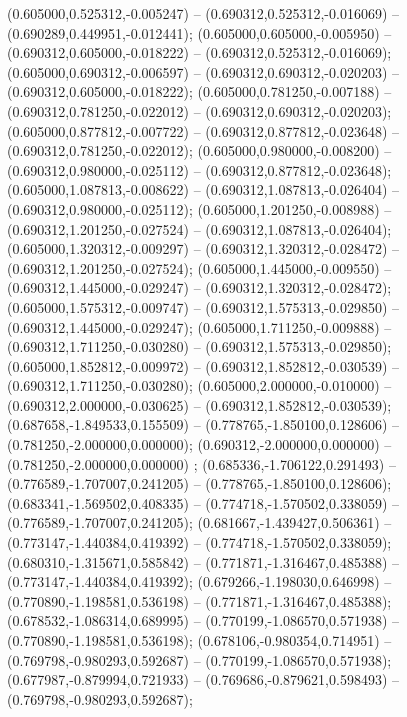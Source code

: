  (0.605000,0.525312,-0.005247) -- (0.690312,0.525312,-0.016069) -- (0.690289,0.449951,-0.012441);
 (0.605000,0.605000,-0.005950) -- (0.690312,0.605000,-0.018222) -- (0.690312,0.525312,-0.016069);
 (0.605000,0.690312,-0.006597) -- (0.690312,0.690312,-0.020203) -- (0.690312,0.605000,-0.018222);
 (0.605000,0.781250,-0.007188) -- (0.690312,0.781250,-0.022012) -- (0.690312,0.690312,-0.020203);
 (0.605000,0.877812,-0.007722) -- (0.690312,0.877812,-0.023648) -- (0.690312,0.781250,-0.022012);
 (0.605000,0.980000,-0.008200) -- (0.690312,0.980000,-0.025112) -- (0.690312,0.877812,-0.023648);
 (0.605000,1.087813,-0.008622) -- (0.690312,1.087813,-0.026404) -- (0.690312,0.980000,-0.025112);
 (0.605000,1.201250,-0.008988) -- (0.690312,1.201250,-0.027524) -- (0.690312,1.087813,-0.026404);
 (0.605000,1.320312,-0.009297) -- (0.690312,1.320312,-0.028472) -- (0.690312,1.201250,-0.027524);
 (0.605000,1.445000,-0.009550) -- (0.690312,1.445000,-0.029247) -- (0.690312,1.320312,-0.028472);
 (0.605000,1.575312,-0.009747) -- (0.690312,1.575313,-0.029850) -- (0.690312,1.445000,-0.029247);
 (0.605000,1.711250,-0.009888) -- (0.690312,1.711250,-0.030280) -- (0.690312,1.575313,-0.029850);
 (0.605000,1.852812,-0.009972) -- (0.690312,1.852812,-0.030539) -- (0.690312,1.711250,-0.030280);
 (0.605000,2.000000,-0.010000) -- (0.690312,2.000000,-0.030625) -- (0.690312,1.852812,-0.030539);
 (0.687658,-1.849533,0.155509) -- (0.778765,-1.850100,0.128606) -- (0.781250,-2.000000,0.000000);
 (0.690312,-2.000000,0.000000) -- (0.781250,-2.000000,0.000000) ;
 (0.685336,-1.706122,0.291493) -- (0.776589,-1.707007,0.241205) -- (0.778765,-1.850100,0.128606);
 (0.683341,-1.569502,0.408335) -- (0.774718,-1.570502,0.338059) -- (0.776589,-1.707007,0.241205);
 (0.681667,-1.439427,0.506361) -- (0.773147,-1.440384,0.419392) -- (0.774718,-1.570502,0.338059);
 (0.680310,-1.315671,0.585842) -- (0.771871,-1.316467,0.485388) -- (0.773147,-1.440384,0.419392);
 (0.679266,-1.198030,0.646998) -- (0.770890,-1.198581,0.536198) -- (0.771871,-1.316467,0.485388);
 (0.678532,-1.086314,0.689995) -- (0.770199,-1.086570,0.571938) -- (0.770890,-1.198581,0.536198);
 (0.678106,-0.980354,0.714951) -- (0.769798,-0.980293,0.592687) -- (0.770199,-1.086570,0.571938);
 (0.677987,-0.879994,0.721933) -- (0.769686,-0.879621,0.598493) -- (0.769798,-0.980293,0.592687);
